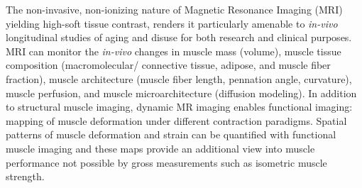 The non-invasive, non-ionizing nature of Magnetic Resonance Imaging (MRI) yielding high-soft tissue contrast, renders it particularly amenable to \textit{in-vivo} longitudinal studies of aging and disuse for both research and clinical purposes. 
MRI can monitor the \textit{in-vivo} changes in muscle mass (volume), muscle tissue composition (macromolecular/ connective tissue, adipose, and muscle fiber fraction), muscle architecture (muscle fiber length, pennation angle, curvature), muscle perfusion, and muscle microarchitecture (diffusion modeling). 
In addition to structural muscle imaging, dynamic MR imaging enables functional imaging: mapping of muscle deformation under different contraction paradigms. 
Spatial patterns of muscle deformation and strain can be quantified with functional muscle imaging and these maps provide an additional view into muscle performance not possible by gross measurements such as isometric muscle strength. 

